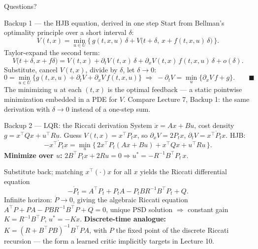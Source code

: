 \documentclass[10pt, aspectratio=169]{beamer}
\begin{document}
\begin{frame}[standout]
Questions?
\end{frame}

\appendix

\begin{frame}{Backup 1 --- the HJB equation, derived in one step}
\footnotesize
Start from Bellman's optimality principle over a short interval $\delta$:
\[
V(t,x) = \min_{u\in U}\Big\{\, g(t,x,u)\,\delta + V\big(t+\delta,\, x + f(t,x,u)\,\delta\big)\,\Big\}.
\]
Taylor-expand the second term:
\[
V\big(t+\delta, x + f\delta\big) = V(t,x) + \partial_t V(t,x)\,\delta + \partial_x V(t,x)\, f(t,x,u)\,\delta + o(\delta).
\]
Substitute, cancel $V(t,x)$, divide by $\delta$, let $\delta\to0$:
\[
0 = \min_{u\in U}\Big\{ g(t,x,u) + \partial_t V + \partial_x V\, f(t,x,u)\Big\}
\;\Rightarrow\;
-\partial_t V = \min_{u} \big\{\partial_x V\, f + g\big\}. \qquad\blacksquare
\]
\medskip
The minimizing $u$ at each $(t,x)$ is the optimal feedback --- a static pointwise minimization embedded in a PDE for $V$. Compare Lecture 7, Backup 1: the same derivation with $\delta\to0$ instead of a one-step sum.
\end{frame}

\begin{frame}{Backup 2 --- LQR: the Riccati derivation}
\footnotesize
System $\dot x = Ax+Bu$, cost density $g = x^\top Q x + u^\top R u$. Guess $V(t,x)=x^\top P_t x$, so $\partial_x V = 2P_t x$, $\partial_t V = x^\top \dot P_t x$. HJB:
\[
-x^\top \dot P_t x = \min_u\Big\{\, 2 x^\top P_t (Ax + Bu) + x^\top Q x + u^\top R u \,\Big\}.
\]
\textbf{Minimize over $u$:} $2B^\top P_t x + 2R u = 0 \Rightarrow u^* = -R^{-1}B^\top P_t\, x$.
\medskip

Substitute back; matching $x^\top(\cdot)x$ for all $x$ yields the \alert{Riccati differential equation}
\[
-\dot P_t = A^\top P_t + P_t A - P_t B R^{-1} B^\top P_t + Q.
\]
Infinite horizon: $\dot P\to0$, giving the \alert{algebraic Riccati equation} $A^\top P + PA - PBR^{-1}B^\top P + Q = 0$, unique PSD solution $\Rightarrow$ constant gain $K = R^{-1}B^\top P$, $u^* = -Kx$.
\medskip
\textbf{Discrete-time analogue:} $K = (R + B^\top P B)^{-1} B^\top P A$, with $P$ the fixed point of the discrete Riccati recursion --- the form a learned critic implicitly targets in Lecture 10.
\end{frame}
\end{document}
